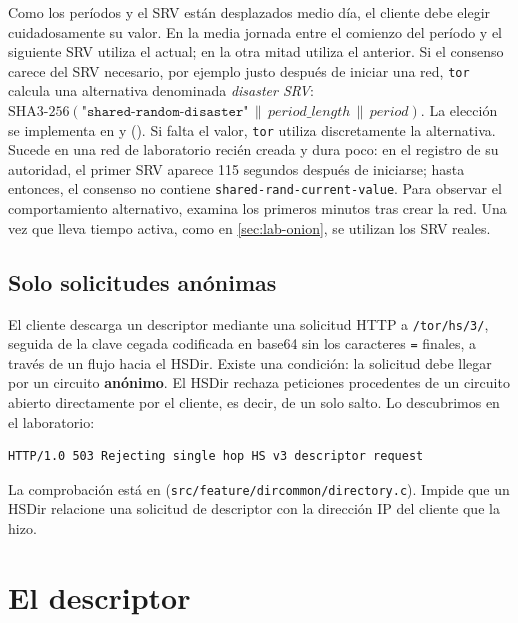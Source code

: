 \begin{approfondimento}
Como los períodos y el SRV están desplazados medio día, el cliente debe elegir cuidadosamente su valor. En la media jornada entre el comienzo del período y el siguiente SRV utiliza el actual; en la otra mitad utiliza el anterior. Si el consenso carece del SRV necesario, por ejemplo justo después de iniciar una red, \texttt{tor} calcula una alternativa denominada \emph{disaster SRV}: $\mathrm{SHA3\text{-}256}(\texttt{"shared-random-disaster"} \,\|\, \mathit{period\_length} \,\|\, \mathit{period})$. La elección se implementa en  y  (). Si falta el valor, \texttt{tor} utiliza discretamente la alternativa. Sucede en una red de laboratorio recién creada y dura poco: en el registro de su autoridad, el primer SRV aparece 115 segundos después de iniciarse; hasta entonces, el consenso no contiene \texttt{shared-rand-current-value}. Para observar el comportamiento alternativo, examina los primeros minutos tras crear la red. Una vez que lleva tiempo activa, como en \cref{sec:lab-onion}, se utilizan los SRV reales.
\end{approfondimento}

\subsection{Solo solicitudes anónimas}

El cliente descarga un descriptor mediante una solicitud HTTP a \nolinkurl{/tor/hs/3/}, seguida de la clave cegada codificada en base64 sin los caracteres \texttt{=} finales, a través de un flujo  hacia el HSDir. Existe una condición: la solicitud debe llegar por un circuito \textbf{anónimo}. El HSDir rechaza peticiones procedentes de un circuito abierto directamente por el cliente, es decir, de un solo salto. Lo descubrimos en el laboratorio:
\begin{lstlisting}[numbers=none]
HTTP/1.0 503 Rejecting single hop HS v3 descriptor request
\end{lstlisting}

La comprobación está en  (\nolinkurl{src/feature/dircommon/directory.c}). Impide que un HSDir relacione una solicitud de descriptor con la dirección IP del cliente que la hizo.

\section{El descriptor}\label{sec:os-descrittore}

